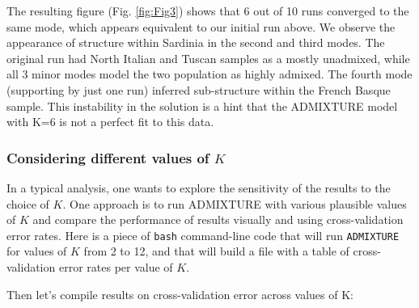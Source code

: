 \documentclass{svmult}       %
\newenvironment{Shaded}{\begin{snugshade}}{\end{snugshade}}
\newcommand{\KeywordTok}[1]{\textcolor[rgb]{0.13,0.29,0.53}{\textbf{#1}}}
\newcommand{\CommentTok}[1]{\textcolor[rgb]{0.56,0.35,0.01}{\textit{#1}}}
\newcommand{\FunctionTok}[1]{\textcolor[rgb]{0.00,0.00,0.00}{#1}}
\newcommand{\VariableTok}[1]{\textcolor[rgb]{0.00,0.00,0.00}{#1}}
\newcommand{\ExtensionTok}[1]{#1}
\newcommand{\NormalTok}[1]{#1}
\begin{document}
The resulting figure (Fig. \ref{fig:Fig3}) shows that 6 out of 10 runs converged to the same
mode, which appears equivalent to our initial run above. We observe the
appearance of structure within Sardinia in the second and third modes.
The original run had North Italian and Tuscan samples as a mostly
unadmixed, while all 3 minor modes model the two population as highly
admixed. The fourth mode (supporting by just one run) inferred
sub-structure within the French Basque sample. This instability in the
solution is a hint that the ADMIXTURE model with K=6 is not a perfect
fit to this data.

\subsubsection{\texorpdfstring{Considering different values of
\(K\)}{Considering different values of K}}\label{considering-different-values-of-k}

In a typical analysis, one wants to explore the sensitivity of the
results to the choice of \(K\). One approach is to run ADMIXTURE with
various plausible values of \(K\) and compare the performance of results
visually and using cross-validation error rates. Here is a piece of
\texttt{bash} command-line code that will run \texttt{ADMIXTURE} for
values of \(K\) from 2 to 12, and that will build a file with a table of
cross-validation error rates per value of \(K\).

\begin{Shaded}
\end{Shaded}

Then let's compile results on cross-validation error across values of K:
\end{document}
